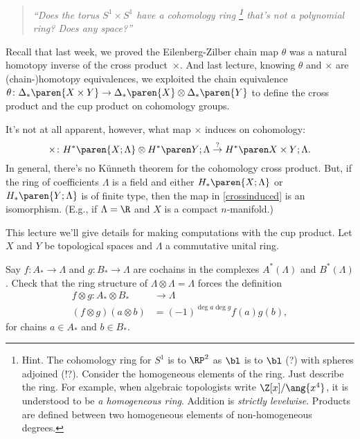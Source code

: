 \begin{quote}
    \textit{``Does the torus $S^1 \times S^1$ have a cohomology ring%
        \footnote{\textsf{Hint.} The cohomology ring for $S^1$ is to $\RP^2$ as $\bl$ is to $\bl$ (?) with spheres adjoined (!?). 
        Consider the homogeneous elements of the ring. 
        Just describe the ring. 
        For example, when algebraic topologists write $\Z[x]/\ang{x^4}$, it is understood to be \emph{a homogeneous ring}. Addition is \emph{strictly levelwise}. Products are defined between two homogeneous elements of non-homogeneous degrees.}
    that's not a polynomial ring? Does any space?''}
\end{quote}

Recall that last week, we proved the Eilenberg-Zilber chain map $\theta$ was a natural homotopy inverse of the cross product~$\times$. 
And last lecture, knowing $\theta$ and $\times$ are (chain-)homotopy equivalences, we exploited the chain equivalence $\theta \colon {\Delta}_{*}\paren{X \times Y} \to {\Delta}_{*}\paren{X} \otimes {\Delta}_{*}\paren{Y}$
to define the cross product and the cup product on cohomology groups. 
\begin{note}[]
   It's not at all apparent, however, what map $\times$ induces on cohomology:
   \begin{equation}
       \label{crossinduced}
       \times \colon H^*\paren{ X; \Lambda } \otimes \coho{Y}{\Lambda} \overset{?}{\to} \coho{X\times Y}{\Lambda}.
   \end{equation}
    In general, there's no Künneth theorem for the cohomology cross product. 
    But, if the ring of coefficients $\Lambda$ is a field and either ${H}_{*}\paren{X;\Lambda}$ or ${H}_{*}\paren{Y;\Lambda}$ is of finite type, then the map in \eqref{crossinduced} is an isomorphism. 
    (E.g., if $\Lambda = \R$ and $X$ is a compact $n$-manifold.)
\end{note}
This lecture we'll give details for making computations with the cup product. Let $X$ and $Y$ be topological spaces and $\Lambda$ a commutative unital ring. 

\begin{todo}[]
    Say $f\colon A_* \to \Lambda$ and $g\colon B_* \to \Lambda$ are cochains in the complexes $A^*(\Lambda)$ and $B^*(\Lambda)$. 
    Check that the ring structure of $\Lambda \otimes \Lambda = \Lambda$ forces the definition
    \begin{align*}
        f \otimes g \colon  A_* \otimes B_* & \to \Lambda\\
        (f \otimes g)(a \otimes b) &= (-1)^{\deg a \deg g} f(a) g(b),
    \end{align*}
    for chains $a \in A_*$ and $b \in B_*$.
\end{todo}

